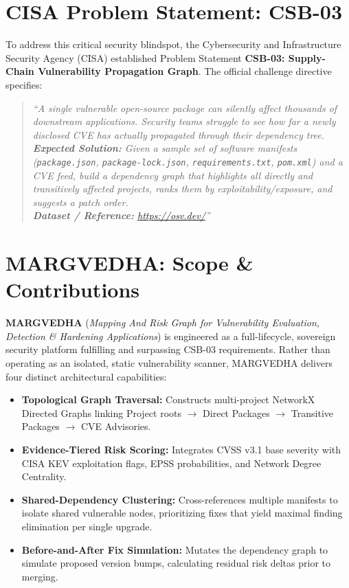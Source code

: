 \documentclass[12pt,a4paper,oneside]{report}
\begin{document}
\section{CISA Problem Statement: CSB-03}
To address this critical security blindspot, the Cybersecurity and Infrastructure Security Agency (CISA) established Problem Statement \textbf{CSB-03: Supply-Chain Vulnerability Propagation Graph}. The official challenge directive specifies:
\begin{quote}
    \textit{``A single vulnerable open-source package can silently affect thousands of downstream applications. Security teams struggle to see how far a newly disclosed CVE has actually propagated through their dependency tree.\\
    \textbf{Expected Solution:} Given a sample set of software manifests (\texttt{package.json}, \texttt{package-lock.json}, \texttt{requirements.txt}, \texttt{pom.xml}) and a CVE feed, build a dependency graph that highlights all directly and transitively affected projects, ranks them by exploitability/exposure, and suggests a patch order.\\
    \textbf{Dataset / Reference:} \url{https://osv.dev/}''}
\end{quote}

\section{MARGVEDHA: Scope \& Contributions}
\textbf{MARGVEDHA} (\textit{Mapping And Risk Graph for Vulnerability Evaluation, Detection \& Hardening Applications}) is engineered as a full-lifecycle, sovereign security platform fulfilling and surpassing CSB-03 requirements. Rather than operating as an isolated, static vulnerability scanner, MARGVEDHA delivers four distinct architectural capabilities:
\begin{itemize}
    \item \textbf{Topological Graph Traversal:} Constructs multi-project NetworkX Directed Graphs linking Project roots $\to$ Direct Packages $\to$ Transitive Packages $\to$ CVE Advisories.
    \item \textbf{Evidence-Tiered Risk Scoring:} Integrates CVSS v3.1 base severity with CISA KEV exploitation flags, EPSS probabilities, and Network Degree Centrality.
    \item \textbf{Shared-Dependency Clustering:} Cross-references multiple manifests to isolate shared vulnerable nodes, prioritizing fixes that yield maximal finding elimination per single upgrade.
    \item \textbf{Before-and-After Fix Simulation:} Mutates the dependency graph to simulate proposed version bumps, calculating residual risk deltas prior to merging.
\end{itemize}
\end{document}
